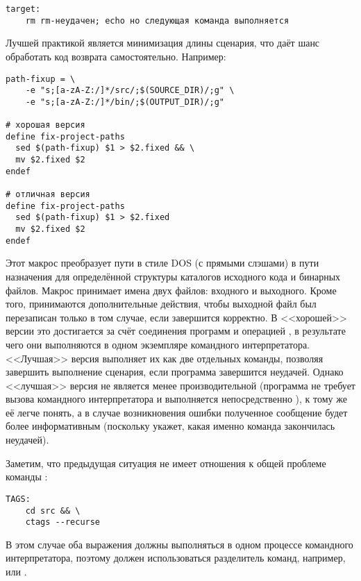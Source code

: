 {\footnotesize
\begin{verbatim}
target:
    rm rm-неудачен; echo но следующая команда выполняется 
\end{verbatim}
}

Лучшей практикой является минимизация длины сценария, что даёт
\GNUmake{} шанс обработать код возврата самостоятельно. Например:

{\footnotesize
\begin{verbatim}
path-fixup = \
    -e "s;[a-zA-Z:/]*/src/;$(SOURCE_DIR)/;g" \
    -e "s;[a-zA-Z:/]*/bin/;$(OUTPUT_DIR)/;g"

# хорошая версия
define fix-project-paths
  sed $(path-fixup) $1 > $2.fixed && \
  mv $2.fixed $2
endef

# отличная версия
define fix-project-paths
  sed $(path-fixup) $1 > $2.fixed
  mv $2.fixed $2
endef
\end{verbatim}
}

Этот макрос преобразует пути в стиле DOS (с прямыми слэшами) в пути
назначения для определённой структуры каталогов исходного кода и
бинарных файлов. Макрос принимает имена двух файлов: входного и
выходного. Кроме того, принимаются дополнительные действия, чтобы
выходной файл был перезаписан только в том случае, если 
завершится корректно. В <<хорошей>> версии это достигается за счёт
соединения программ  и \utility{mv} операцией
\command{\&\&}, в результате чего они выполняются в одном экземпляре
командного интерпретатора. <<Лучшая>> версия выполняет их как две
отдельных команды, позволяя \GNUmake{} завершить выполнение сценария,
если программа \utility{sed} завершится неудачей. Однако <<лучшая>>
версия не является менее производительной (программа \utility{mv} не
требует вызова командного интерпретатора и выполняется непосредственно
\GNUmake{}), к тому же её легче понять, а в случае возникновения
ошибки полученное сообщение будет более информативным (поскольку
\GNUmake{} укажет, какая именно команда закончилась неудачей).

Заметим, что предыдущая ситуация не имеет отношения к общей проблеме
команды \utility{cd}:

{\footnotesize
\begin{verbatim}
TAGS:
    cd src && \
    ctags --recurse
\end{verbatim}
}

В этом случае оба выражения должны выполняться в одном процессе
командного интерпретатора, поэтому должен использоваться разделитель
команд, например, \command{;} или \command{\&\&}.

